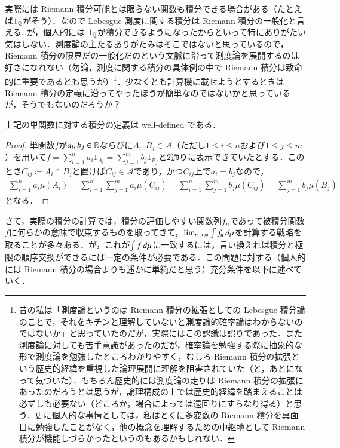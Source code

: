 \begin{dig}
実際には Riemann 積分可能とは限らない関数も積分できる場合がある（たとえば$1_{\mathbb{Q}}$がそう）．なので Lebesgue 測度に関する積分は Riemann 積分の一般化と言える…が，個人的には $1_{\mathbb{Q}}$が積分できるようになったからといって特にありがたい気はしない．測度論の主たるありがたみはそこではないと思っているので，Riemann 積分の限界だの一般化だのという文脈に沿って測度論を展開するのは好きになれない（勿論，測度に関する積分の具体例の中で Riemann 積分は致命的に重要であるとも思うが）\footnote{昔の私は「測度論というのは Riemann 積分の拡張としての Lebesgue 積分論のことで，それをキチンと理解していないと測度論的確率論はわからないのではないか」と思っていたのだが，実際にはこの認識は誤りであった．また測度論に対しても苦手意識があったのだが，確率論を勉強する際に抽象的な形で測度論を勉強したところわかりやすく，むしろ Riemann 積分の拡張という歴史的経緯を重視した論理展開に理解を阻害されていた（と，あとになって気づいた）．もちろん歴史的には測度論の走りは Riemann 積分の拡張にあったのだろうとは思うが，論理構成の上では歴史的経緯を踏まえることは必ずしも必要ない（どころか，場合によっては遠回りにすらなり得る）と思う．更に個人的な事情としては，私はとくに多変数の Riemann 積分を真面目に勉強したことがなく，他の概念を理解するための中継地として Riemann 積分が機能しづらかったというのもあるかもしれない．}．少なくとも計算機に載せようとするときは Riemann 積分の定義に沿ってやったほうが簡単なのではないかと思っているが，そうでもないのだろうか？
\end{dig}

\begin{prop}
上記の単関数に対する積分の定義は well-defined である．
\end{prop}

\begin{proof}
単関数$f$が$a_i, b_j \in \mathbb{R}$ならびに$A_i, B_j \in \mathcal{A}$（ただし$1 \leq i \leq n$および$1 \leq j \leq m$）を用いて$f = \sum_{i=1}^n a_i 1_{A_i} = \sum_{j=1}^m b_j 1_{B_j}$と2通りに表示できていたとする．このとき$C_{ij} \coloneqq A_i \cap B_j$と置けば$C_{ij} \in \mathcal{A}$であり，かつ$C_{ij}$上で$a_i=b_j$なので，
\begin{align}
\sum_{i=1}^n a_i \mu(A_i) = \sum_{i=1}^n \sum_{j=1}^m a_i \mu(C_{ij}) = \sum_{i=1}^n \sum_{j=1}^m b_j \mu(C_{ij}) = \sum_{j=1}^m b_j \mu(B_j)
\end{align}となる．
\end{proof}

さて，実際の積分の計算では，積分の評価しやすい関数列$f_n$であって被積分関数$f$に何らかの意味で収束するものを取ってきて，$\lim_{n \to \infty}\int f_n \mathop{}\!d \mu$を計算する戦略を取ることが多々ある．が，これが$\int f \mathop{}\!d \mu$に一致するには，言い換えれば積分と極限の順序交換ができるには一定の条件が必要である．この問題に対する（個人的には Riemann 積分の場合よりも遥かに単純だと思う）充分条件を以下に述べていく．

